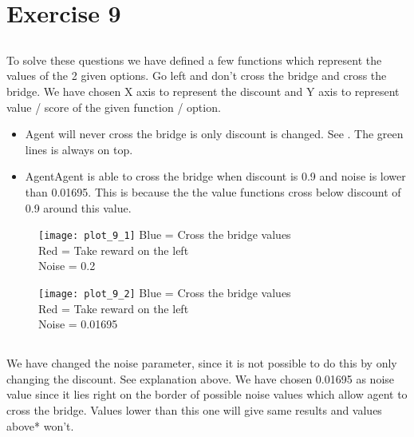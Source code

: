 \section{Exercise 9}
\subsection{}
To solve these questions we have defined a few functions which represent the values of the 2 given options. Go left and don't cross the bridge and cross the bridge. We have chosen X axis to represent the discount and Y axis to represent value / score of the given function / option. \\ \smallskip
\begin{itemize}
  \item Agent will never cross the bridge is only discount is changed. See . The green lines is always on top.
  \item AgentAgent is able to cross the bridge when discount is 0.9 and noise is lower than 0.01695. This is because the the value functions cross below discount of 0.9 around this value. 
\end{itemize}

\begin{figure}[H]
\caption{}
\centering
\texttt{[image: plot\_9\_1]}
Blue = Cross the bridge values \\ 
Red = Take reward on the left \\
Noise = 0.2
\label{fig:e91}
\end{figure}

\begin{figure}[H]
\caption{}
\centering
\texttt{[image: plot\_9\_2]}
Blue = Cross the bridge values \\ 
Red = Take reward on the left \\
Noise = 0.01695
\label{fig:e92}
\end{figure}

\subsection{}
We have changed the noise parameter, since it is not possible to do this by only changing the discount. See explanation above. We have chosen 0.01695 as noise value since it lies right on the border of possible noise values which allow agent to cross the bridge. Values lower than this one will give same results and values above* won't.